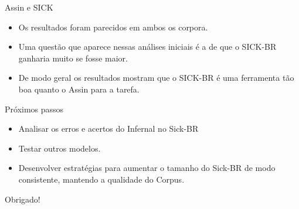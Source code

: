 \documentclass{beamer}
\begin{document}
\begin{frame}{Assin e SICK}
\begin{itemize}
	\item Os resultados foram parecidos em ambos os corpora.\\
	\item Uma questão que aparece nessas análises iniciais é a de que o SICK-BR ganharia muito se fosse maior.\\
	\item De modo geral os resultados mostram que o SICK-BR é uma ferramenta tão boa quanto o Assin para a tarefa.\\
\end{itemize}
\end{frame}


\begin{frame}{Próximos passos}
\begin{itemize}
	\item Analisar os erros e acertos do Infernal no Sick-BR\\
	\item Testar outros modelos.\\
	\item Desenvolver estratégias para aumentar o tamanho do Sick-BR de modo consistente, mantendo a qualidade do Corpus.\\
\end{itemize}
\end{frame}
\begin{frame}

\centering\large{Obrigado!}

\end{frame}

\end{document}
